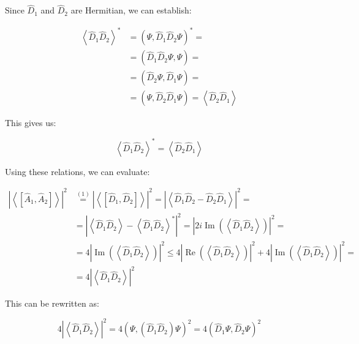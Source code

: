 \documentclass[10pt]{article}
\begin{document}
Since $\hat{D}_1$ and $\hat{D}_2$ are Hermitian, we can establish:

\begin{align*}
\left\langle\hat{D}_{1} \hat{D}_{2}\right\rangle^{*} & =\left(\Psi, \hat{D}_{1} \hat{D}_{2} \Psi\right)^{*}= \\
& =\left(\hat{D}_{1} \hat{D}_{2} \Psi, \Psi\right)=  \tag{7.10}\\
& =\left(\hat{D}_{2} \Psi, \hat{D}_{1} \Psi\right)= \\
& =\left(\Psi, \hat{D}_{2} \hat{D}_{1} \Psi\right)=\left\langle\hat{D}_{2} \hat{D}_{1}\right\rangle
\end{align*}

This gives us:

\begin{equation*}
\left\langle\hat{D}_{1} \hat{D}_{2}\right\rangle^{*}=\left\langle\hat{D}_{2} \hat{D}_{1}\right\rangle \tag{7.11}
\end{equation*}

Using these relations, we can evaluate:

\begin{align*}
\left|\left\langle\left[\hat{A}_{1}, \hat{A}_{2}\right]\right\rangle\right|^{2} & \stackrel{(1)}{=}\left|\left\langle\left[\hat{D}_{1}, \hat{D}_{2}\right]\right\rangle\right|^{2}=\left|\left\langle\hat{D}_{1} \hat{D}_{2}-\hat{D}_{2} \hat{D}_{1}\right\rangle\right|^{2}= \\
& =\left|\left\langle\hat{D}_{1} \hat{D}_{2}\right\rangle-\left\langle\hat{D}_{1} \hat{D}_{2}\right\rangle^{*}\right|^{2}=\left|2 i \operatorname{Im}\left(\left\langle\hat{D}_{1} \hat{D}_{2}\right\rangle\right)\right|^{2}= \\
& =4\left|\operatorname{Im}\left(\left\langle\hat{D}_{1} \hat{D}_{2}\right\rangle\right)\right|^{2} \leq 4\left|\operatorname{Re}\left(\left\langle\hat{D}_{1} \hat{D}_{2}\right\rangle\right)\right|^{2}+4\left|\operatorname{Im}\left(\left\langle\hat{D}_{1} \hat{D}_{2}\right\rangle\right)\right|^{2}= \\
& =4\left|\left\langle\hat{D}_{1} \hat{D}_{2}\right\rangle\right|^{2} \tag{7.12}
\end{align*}

This can be rewritten as:

\begin{equation*}
4\left|\left\langle\hat{D}_{1} \hat{D}_{2}\right\rangle\right|^{2}=4\left(\Psi,\left(\hat{D}_{1} \hat{D}_{2}\right) \Psi\right)^{2}=4\left(\hat{D}_{1} \Psi, \hat{D}_{2} \Psi\right)^{2} \tag{7.13}
\end{equation*}
\end{document}
